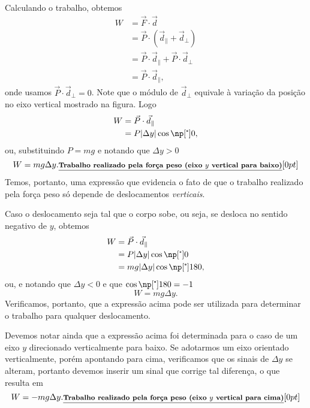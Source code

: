 \noindent{}Calculando o trabalho, obtemos
\begin{align}
    W &= \vec{F}\cdot\vec{d} \\
    &= \vec{P}\cdot(\vec{d}_{\parallel} + \vec{d}_{\perp}) \\
    &= \vec{P}\cdot\vec{d}_{\parallel} + \vec{P}\cdot\vec{d}_{\perp} \\
    &= \vec{P}\cdot\vec{d}_{\parallel},
\end{align}
%
onde usamos $\vec{P}\cdot\vec{d}_{\perp} = 0$. Note que o módulo de $\vec{d}_{\perp}$ equivale à variação da posição no eixo vertical mostrado na figura. Logo
\begin{align}
    W &= \vec{P}\cdot\vec{d}_{\parallel} \\
    &= P |\Delta y| \cos\degree{0},
\end{align}
%
ou, substituindo $P = mg$ e notando que $\Delta y > 0$
\begin{equation}\label{Eq:TrabalhoPeso}
    W = mg\Delta y. \relax{\footnotesize\emph{\textbf{Trabalho realizado pela força peso (eixo $y$ vertical para baixo)}}}[0pt]
\end{equation}
%
Temos, portanto, uma expressão que evidencia o fato de que o trabalho realizado pela força peso só depende de deslocamentos \emph{verticais}.

Caso o deslocamento seja tal que o corpo sobe, ou seja, se desloca no sentido negativo de $y$, obtemos
\begin{align}
    W &= \vec{P}\cdot\vec{d}_{\parallel} \\
    &= P |\Delta y| \cos\degree{0} \\
    &= mg |\Delta y| \cos\degree{180},
\end{align}
%
ou, e notando que $\Delta y < 0$ e que $\cos\degree{180} = -1$
\begin{equation}
    W = mg\Delta y.
\end{equation}
%
Verificamos, portanto, que a expressão acima pode ser utilizada para determinar o trabalho para qualquer deslocamento. 

Devemos notar ainda que a expressão acima foi determinada para o caso de um eixo $y$ direcionado verticalmente para baixo. Se adotarmos um eixo orientado verticalmente, porém apontando para cima, verificamos que os sinais de $\Delta y$ se alteram, portanto devemos inserir um sinal que corrige tal diferença, o que resulta em
\begin{equation}\label{Eq:TrabalhoPeso2}
    W = -mg\Delta y. \relax{\footnotesize\emph{\textbf{Trabalho realizado pela força peso (eixo $y$ vertical para cima)}}}[0pt]
\end{equation}
  
